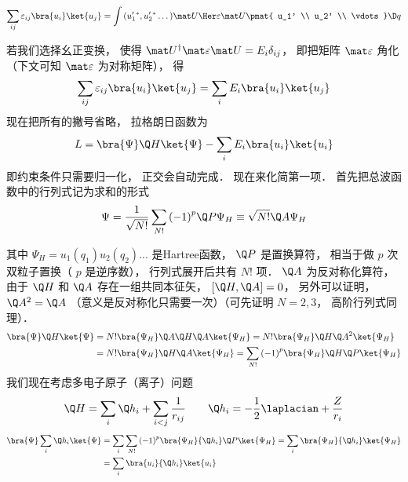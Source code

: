 \begin{equation}
\sum\limits_{ij} { \varepsilon_{ij} \bra{u_i}\ket{u_j} }
= \int {(u'_1{}^* ,u'_2{}^* \dots){\mat U \Her} \varepsilon \mat U
\pmat{ u_1' \\ u_2' \\ \vdots}
\D q}
\end{equation}


若我们选择幺正变换， 使得 ${\mat U^\dag }\mat \varepsilon \mat U = {E_i}{\delta_{ij}}$， %
即把矩阵 $\mat \varepsilon $ 角化（下文可知 $\mat\varepsilon$ 为对称矩阵）， 得
 \begin{equation}
\sum\limits_{ij} {\varepsilon_{ij}} \bra{u_i}\ket{u_j}
 = \sum\limits_i {E_i}  \bra{u_i}\ket{u_j}
\end{equation}
现在把所有的撇号省略， 拉格朗日函数为
\begin{equation}
L =\bra{\Psi}\Q H \ket{\Psi}  - \sum\limits_i E_i \bra{u_i}\ket{u_i}
\end{equation}
即约束条件只需要归一化， 正交会自动完成． 现在来化简第一项． 首先把总波函数中的行列式记为求和的形式
 \begin{equation}
\Psi  = \frac{1}{{\sqrt {N!} }}\sum\limits_{N!} {{{( - 1)}^p}\Q P{\Psi_H}}  \equiv \sqrt {N!} \Q A{\Psi_H}
\end{equation}

其中 ${\Psi_H} = {u_1}({q_1}){u_2}({q_2})...$ 是Hartree函数，  $\Q P$ 是置换算符， 相当于做 $p$ 次双粒子置换（ $p$ 是逆序数）， 行列式展开后共有 $N!$ 项．  $\Q A$ 为反对称化算符， 由于 $\Q H$ 和 $\Q A$ 存在一组共同本征矢， $[\Q H,\Q A] = 0$，  另外可以证明， ${\Q A^2} = \Q A$ （意义是反对称化只需要一次）（可先证明 $N = 2,3$，  高阶行列式同理）．
\begin{equation}
\begin{aligned}
  \bra{\Psi}\Q H\ket{\Psi}  &= N!\bra{ {{\Psi_H}}}\Q A\Q H\Q A \ket{{\Psi_H}} = N!\bra{ {{\Psi_H}} }\Q H{\Q A^2}\ket{{{\Psi_H}}} \\
  &= N!\bra{{{\Psi_H}} }\Q H\Q A\ket{{{\Psi_H}}}   = \sum\limits_{N!} {{( - 1)}^p}\bra{\Psi_H}\Q H\Q P\ket{\Psi_H}\\ 
\end{aligned}
\end{equation}
我们现在考虑多电子原子（离子）问题
\begin{equation}
\Q H = \sum\limits_i {{\Q h_i}}  + \sum\limits_{i < j} {\frac{1}{{{r_{ij}}}}} 
\qquad
{\Q h_i} =  - \frac{1}{2}{\laplacian} + \frac{Z}{{{r_i}}}
\end{equation}
\begin{equation}
\begin{aligned}
\bra{\Psi}\sum\limits_i {{\Q h_i}} \ket{\Psi} & = \sum\limits_i {\sum\limits_{N!} {{{( - 1)}^p}\bra{\Psi_H}{\Q h_i}\Q P \ket{{\Psi_H}} } }  = \sum\limits_i {\bra{\Psi_H} {\Q h_i} \ket{{\Psi_H}}}  \\
&= \sum\limits_i {\bra{u_i}{\Q h_i}\ket{{u_i}}} 
\end{aligned}
\end{equation}
 
